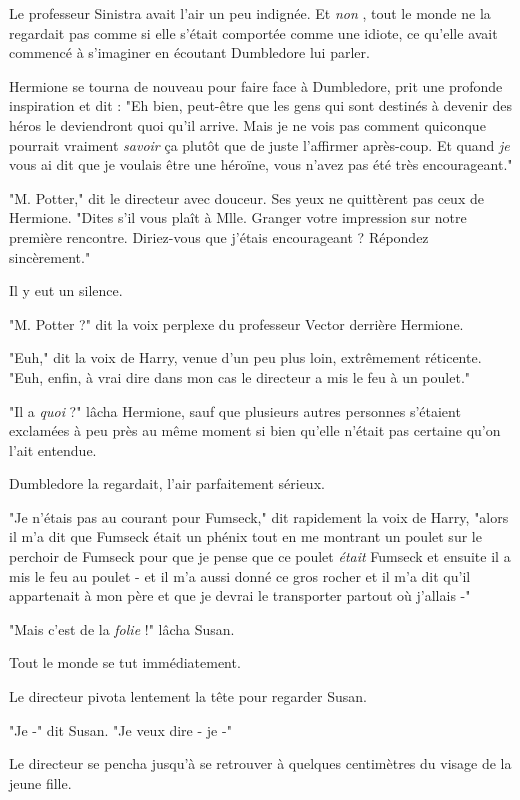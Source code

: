 Le professeur Sinistra avait l'air un peu indignée. Et \emph{non} , tout le monde ne la regardait pas comme si elle s'était comportée comme une idiote, ce qu'elle avait commencé à s'imaginer en écoutant Dumbledore lui parler.

Hermione se tourna de nouveau pour faire face à Dumbledore, prit une profonde inspiration et dit : "Eh bien, peut-être que les gens qui sont destinés à devenir des héros le deviendront quoi qu'il arrive. Mais je ne vois pas comment quiconque pourrait vraiment \emph{savoir}  ça plutôt que de juste l'affirmer après-coup. Et quand \emph{je}  vous ai dit que je voulais être une héroïne, vous n'avez pas été très encourageant."

"M. Potter," dit le directeur avec douceur. Ses yeux ne quittèrent pas ceux de Hermione. "Dites s'il vous plaît à Mlle. Granger votre impression sur notre première rencontre. Diriez-vous que j'étais encourageant ? Répondez sincèrement."

Il y eut un silence.

"M. Potter ?" dit la voix perplexe du professeur Vector derrière Hermione.

"Euh," dit la voix de Harry, venue d'un peu plus loin, extrêmement réticente. "Euh, enfin, à vrai dire dans mon cas le directeur a mis le feu à un poulet."

"Il a \emph{quoi}  ?" lâcha Hermione, sauf que plusieurs autres personnes s'étaient exclamées à peu près au même moment si bien qu'elle n'était pas certaine qu'on l'ait entendue.

Dumbledore la regardait, l'air parfaitement sérieux.

"Je n'étais pas au courant pour Fumseck," dit rapidement la voix de Harry, "alors il m'a dit que Fumseck était un phénix tout en me montrant un poulet sur le perchoir de Fumseck pour que je pense que ce poulet \emph{était}  Fumseck et ensuite il a mis le feu au poulet - et il m'a aussi donné ce gros rocher et il m'a dit qu'il appartenait à mon père et que je devrai le transporter partout où j'allais -"

"Mais c'est de la \emph{folie}  !" lâcha Susan.

Tout le monde se tut immédiatement.

Le directeur pivota lentement la tête pour regarder Susan.

"Je -" dit Susan. "Je veux dire - je -"

Le directeur se pencha jusqu'à se retrouver à quelques centimètres du visage de la jeune fille.


